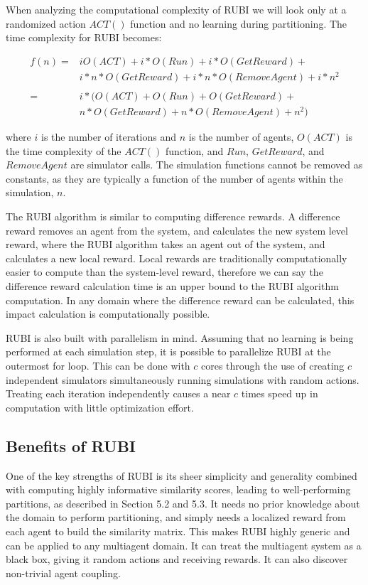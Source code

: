 \documentclass[onehalf,11pt]{beavtex}
\begin{document}
When analyzing the computational complexity of RUBI we will look only at a randomized action $ACT()$ function and no learning during partitioning. The time complexity for RUBI becomes:

\begin{equation}
\begin{split}
f(n) =& i O(ACT) + i * O(Run) + i * O(GetReward) + \\
& i * n * O(GetReward) + i * n * O(RemoveAgent) + i * n^2 \\
&\\
=& i * (O(ACT) + O(Run) + O(GetReward) + \\
& n  * O(GetReward) + n  * O(RemoveAgent) + n^2)
\end{split}
\end{equation}

where $i$ is the number of iterations and $n$ is the number of agents, $O(ACT)$ is the time complexity of the $ACT()$ function, and $Run$, $GetReward$, and $RemoveAgent$ are simulator calls. The simulation functions cannot be removed as constants, as they are typically a function of the number of agents within the simulation, $n$.

The RUBI algorithm is similar to computing difference rewards. A difference reward removes an agent from the system, and calculates the new system level reward, where the RUBI algorithm takes an agent out of the system, and calculates a new local reward. Local rewards are traditionally computationally easier to compute than the system-level reward, therefore we can say the difference reward calculation time is an upper bound to the RUBI algorithm computation. In any domain where the difference reward can be calculated, this impact calculation is computationally possible.

RUBI is also built with parallelism in mind. Assuming that no learning is being performed at each simulation step, it is possible to parallelize RUBI at the outermost for loop. This can be done with $c$ cores through the use of creating $c$ independent simulators simultaneously running simulations with random actions. Treating each iteration independently causes a near $c$ times speed up in computation with little optimization effort.


\subsection{Benefits of RUBI}

One of the key strengths of RUBI is its sheer simplicity and generality combined with computing highly informative similarity scores, leading to well-performing partitions, as described in Section 5.2 and 5.3. It needs no prior knowledge about the domain to perform partitioning, and simply needs a localized reward from each agent to build the similarity matrix. This makes RUBI highly generic and can be applied to any multiagent domain. It can treat the multiagent system as a black box, giving it random actions and receiving rewards. It can also discover non-trivial agent coupling. 
\end{document}
